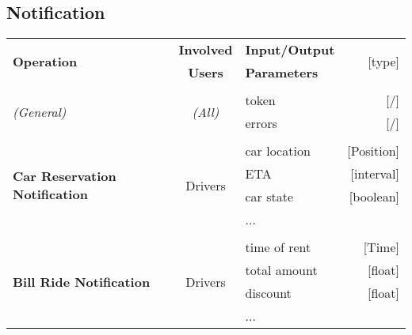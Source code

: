 \subsection{Notification}
	\begin{center}
		\begin{tabular}{ l | c | l   r }
			\multirow{2}{*}{\textbf{Operation}} & \textbf{Involved} & \textbf{Input/Output} & \multirow{2}{*}{[type]}\\
			& \textbf{Users} & \textbf{Parameters} & \\ [1.5ex]
			\hline\hline\\
			
			\multirow{2}{*}{\textit{(General)}}
				& \multirow{2}{*}{\textit{(All)}}
					&	token & [/]\\
					&&	errors & [/]\\ [1.5ex]
			\hline\\
			
			\multirow{4}{*}{\textbf{Car Reservation Notification}}
				& \multirow{4}{*}{Drivers}
					&	car location & [Position]\\
					&&	ETA & [interval]\\
					&&	car state & [boolean]\\
					&&	... & \\ [1.5ex]
			\hline\\
			
			\multirow{4}{*}{\textbf{Bill Ride Notification}}
				& \multirow{4}{*}{Drivers}
					&	time of rent & [Time]\\
					&&	total amount & [float]\\
					&&	discount & [float]\\
					&&	... & \\ [1.5ex]
			\hline
		\end{tabular}
	\end{center}


